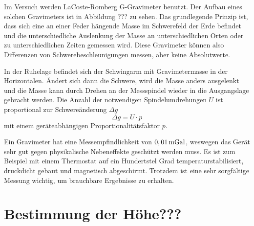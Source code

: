 Im Versuch werden LaCoste-Romberg G-Gravimeter benutzt. Der Aufbau eines solchen Gravimeters ist in Abbildung ??? zu sehen. Das grundlegende Prinzip ist, dass sich eine an einer Feder hängende Masse im Schwerefeld der Erde befindet und die unterschiedliche Auslenkung der Masse an unterschiedlichen Orten oder zu unterschiedlichen Zeiten gemessen wird. Diese Gravimeter können also Differenzen von Schwerebeschleunigungen messen, aber keine Absolutwerte.


In der Ruhelage befindet sich der Schwingarm mit Gravimetermasse in der Horizontalen. Ändert sich dann die Schwere, wird die Masse anders ausgelenkt und die Masse kann durch Drehen an der Messspindel wieder in die Ausgangslage gebracht werden. Die Anzahl der notwendigen Spindelumdrehungen $U$ ist proportional zur Schwereänderung $\Delta g$
\begin{equation}
 \Delta g= U\cdot p
\end{equation}
mit einem geräteabhängigen Proportionalitätsfaktor $p$.

Ein Gravimeter hat eine Messempfindlichkeit von $0,01\,\mathrm{mGal}$, weswegen das Gerät sehr gut gegen physikalische Nebeneffekte geschützt werden muss. Es ist zum Beispiel mit einem Thermostat auf ein Hundertstel Grad temperaturstabilisiert, druckdicht gebaut und magnetisch abgeschirmt. Trotzdem ist eine sehr sorgfältige Messung wichtig, um brauchbare Ergebnisse zu erhalten. 

\section{Bestimmung der Höhe???}

